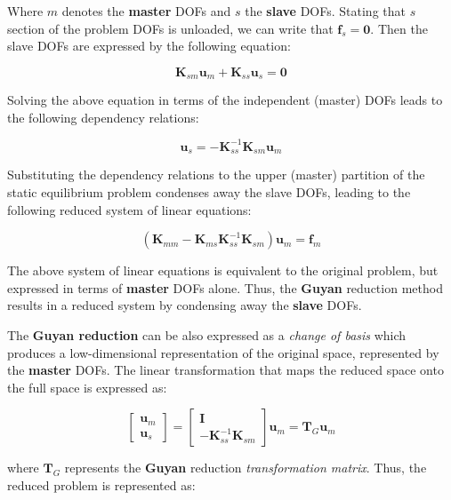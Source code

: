 \documentclass[10pt,b5paper,titlepage]{book}
\newcommand{\m}{\mathbf}
\begin{document}
Where $ m $ denotes the \textbf{master} DOFs and $ s $ the \textbf{slave} DOFs.
Stating that $ s $ section of the problem DOFs is unloaded, we can
write that $ \m{f}_s = \m{0} $. Then the slave DOFs are expressed
by the following equation:

\begin{equation}
    \m{K}_{sm} \m{u}_m + \m{K}_{ss} \m{u}_s = \m{0}
\end{equation}

Solving the above equation in terms of the independent (master) DOFs leads to
the following dependency relations:

\begin{equation}
    \m{u}_s = -\m{K}_{ss}^{-1} \m{K}_{sm} \m{u}_m
\end{equation}

Substituting the dependency relations to the upper (master) partition of the static
equilibrium problem condenses away the slave DOFs, leading to the following reduced
system of linear equations:

\begin{equation}
    \left(\m{K}_{mm} - \m{K}_{ms} \m{K}_{ss}^{-1} \m{K}_{sm} \right)
    \m{u}_m = \m{f}_m
\end{equation}

The above system of linear equations is equivalent to the original problem, but expressed
in terms of \textbf{master} DOFs alone. Thus, the \textbf{Guyan} reduction method
results in a reduced system by condensing away the \textbf{slave} DOFs.

The \textbf{Guyan reduction} can be also expressed as a \textit{change of basis} which
produces a low-dimensional representation of the original space, represented by the
\textbf{master} DOFs. The linear transformation that maps the reduced space onto
the full space is expressed as:

\begin{equation}
    \begin{bmatrix}
        \m{u}_m \\
        \m{u}_s
    \end{bmatrix} =
    \begin{bmatrix}
        \m{I} \\
        -\m{K}_{ss}^{-1} \m{K}_{sm}
    \end{bmatrix}
    \m{u}_m = \m{T}_G \m{u}_m
\end{equation}

where $ \m{T}_G $ represents the \textbf{Guyan} reduction \textit{transformation matrix}.
Thus, the reduced problem is represented as:
\end{document}
